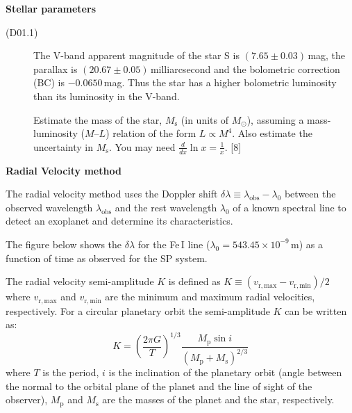 \medskip\noindent\textbf{Stellar parameters}

\begin{description}
\item[(D01.1)] The V-band apparent magnitude of the star S is
  $(7.65\pm0.03)$\,mag, the parallax is $(20.67\pm0.05)$\,milliarcsecond and
  the bolometric correction (BC) is $-0.0650$\,mag. Thus the star has a higher
  bolometric luminosity than its luminosity in the V-band.

  Estimate the mass of the star, $M_{\mathrm{s}}$ (in units of $M_\odot$),
  assuming a mass-luminosity ($M$--$L$) relation of the form $L \propto M^4$.
  Also estimate the uncertainty in $M_{\mathrm{s}}$. You may need
  $\frac{d}{dx}\ln x = \frac{1}{x}$. \hfill[8]
\end{description}

\medskip\noindent\textbf{Radial Velocity method}

The radial velocity method uses the Doppler shift
$\delta\lambda \equiv \lambda_{\mathrm{obs}} - \lambda_0$ between the observed
wavelength $\lambda_{\mathrm{obs}}$ and the rest wavelength $\lambda_0$ of a
known spectral line to detect an exoplanet and determine its characteristics.

The figure below shows the $\delta\lambda$ for the Fe\,I line
($\lambda_0 = 543.45\times10^{-9}$\,m) as a function of time as observed for
the SP system.


The radial velocity semi-amplitude $K$ is defined as
$K \equiv (v_{\mathrm{r,max}} - v_{\mathrm{r,min}})/2$ where
$v_{\mathrm{r,max}}$ and $v_{\mathrm{r,min}}$ are the minimum and maximum
radial velocities, respectively.
For a circular planetary orbit the semi-amplitude $K$ can be written as:
\[
K = \left(\frac{2\pi G}{T}\right)^{1/3}
    \frac{M_{\mathrm{p}}\sin i}{(M_{\mathrm{p}} + M_{\mathrm{s}})^{2/3}}
\]
where $T$ is the period, $i$ is the inclination of the planetary orbit (angle
between the normal to the orbital plane of the planet and the line of sight of
the observer), $M_{\mathrm{p}}$ and $M_{\mathrm{s}}$ are the masses of the
planet and the star, respectively.

